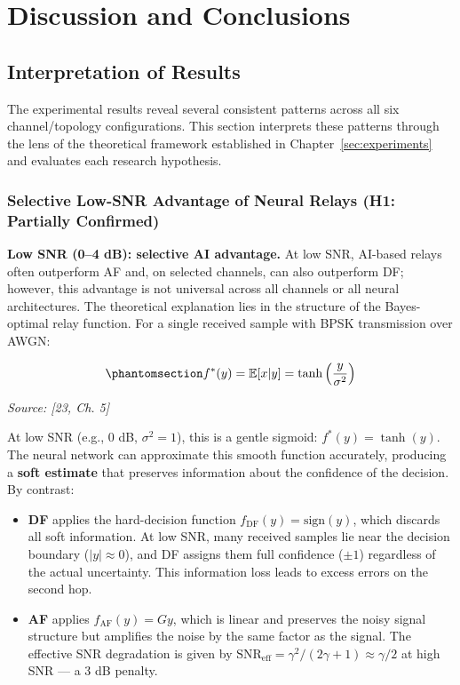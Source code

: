 \chapter{Discussion and Conclusions}\label{sec:discussion-and-conclusions}

\section{Interpretation of Results}\label{sec:interpretation-of-results}

The experimental results reveal several consistent patterns across all six channel/topology configurations. This section interprets these patterns through the lens of the theoretical framework established in Chapter~\ref{sec:experiments} and evaluates each research hypothesis.

\subsection{Selective Low-SNR Advantage of Neural Relays (H1: Partially Confirmed)}\label{sec:selective-low-snr-advantage-of-neural-relays-h1-partially-confirmed}

\textbf{Low SNR (0--4 dB): selective AI advantage.} At low SNR, AI-based relays often outperform AF and, on selected channels, can also outperform DF; however, this advantage is not universal across all channels or all neural architectures. The theoretical explanation lies in the structure of the Bayes-optimal relay function. For a single received sample with BPSK transmission over AWGN:

\begin{equation}\protect\phantomsection\label{eq:optimal-denoiser-relay}{f^*(y) = \mathbb{E}[x | y] = \tanh\left(\frac{y}{\sigma^2}\right)
}\end{equation} \par{\small\textit{Source: [23, Ch. 5]}}

At low SNR (e.g., 0 dB, \(\sigma^2 = 1\)), this is a gentle sigmoid: \(f^*(y) = \tanh(y)\). The neural network can approximate this smooth function accurately, producing a \textbf{soft estimate} that preserves information about the confidence of the decision. By contrast:

\begin{itemize}
\item
  \textbf{DF} applies the hard-decision function \(f_{\text{DF}}(y) = \text{sign}(y)\), which discards all soft information. At low SNR, many received samples lie near the decision boundary (\(|y| \approx 0\)), and DF assigns them full confidence (\(\pm 1\)) regardless of the actual uncertainty. This information loss leads to excess errors on the second hop.
\item
  \textbf{AF} applies \(f_{\text{AF}}(y) = Gy\), which is linear and preserves the noisy signal structure but amplifies the noise by the same factor as the signal. The effective SNR degradation is given by \(\text{SNR}_{\text{eff}} = \gamma^2 / (2\gamma + 1) \approx \gamma/2\) at high SNR --- a 3 dB penalty.
\end{itemize}

